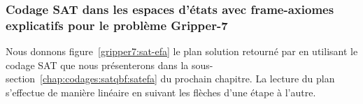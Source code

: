 

\subsubsection{Codage SAT dans les espaces d'états avec frame-axiomes explicatifs pour le problème Gripper-7}

Nous donnons figure~\ref{gripper7:sat-efa} le plan solution retourné par \touistplan en utilisant le codage SAT que nous présenterons dans la sous-section~\ref{chap:codages:satqbf:satefa} du prochain chapitre. La lecture du plan s'effectue de manière linéaire en suivant les flèches d'une étape à l'autre.\\

